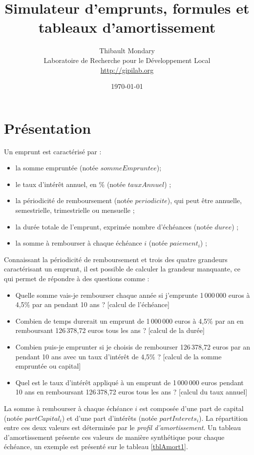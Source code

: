 \documentclass[11pt,a4paper]{scrartcl}
\title{Simulateur d'emprunts, formules et tableaux d'amortissement}
\date{\today}
\author{Thibault Mondary\\Laboratoire de Recherche pour le Développement Local\\\small\url{http://gipilab.org}}
\begin{document}
\maketitle

\section{Présentation}

Un emprunt est caractérisé par :

\begin{itemize}
	\item la somme empruntée (notée $sommeEmpruntee$);
	\item le taux d'intérêt annuel, en \% (notée $tauxAnnuel$) ;
	\item la périodicité de remboursement (notée $periodicite$), qui peut être annuelle, semestrielle, trimestrielle ou mensuelle ;
	\item la durée totale de l'emprunt, exprimée nombre d'échéances (notée $duree$) ;
	\item la somme à rembourser à chaque échéance $i$ (notée $paiement_{i}$) ;
\end{itemize}

Connaissant la périodicité de remboursement et trois des quatre grandeurs caractérisant un emprunt, il est possible de calculer la grandeur manquante, ce qui permet de répondre à des questions comme :

\begin{itemize}
	\item Quelle somme vais-je rembourser chaque année si j'emprunte 1\,000\,000 euros à 4,5\% par an pendant 10 ans ? [calcul de l'échéance]
	\item Combien de temps durerait un emprunt de 1\,000\,000 euros à 4,5\% par an en remboursant 126\,378,72 euros tous les ans ? [calcul de la durée]
	\item Combien puis-je emprunter si je choisis de rembourser 126\,378,72 euros par an pendant 10 ans avec un taux d'intérêt de 4,5\% ? [calcul de la somme empruntée ou capital]
	\item Quel est le taux d'intérêt appliqué à un emprunt de 1\,000\,000 euros pendant 10 ans en remboursant 126\,378,72 euros tous les ans ? [calcul du taux annuel]
\end{itemize}



La somme à rembourser à chaque échéance $i$ est composée d'une part de capital (notée $partCapital_{i}$) et d'une part d'intérêts (notée $partInterets_{i}$). La répartition entre ces deux valeurs est déterminée par le \emph{profil d'amortissement}. Un tableau d'amortissement présente ces valeurs de manière synthétique pour chaque échéance, un exemple est présenté sur le tableau \ref{tblAmort1}.
\end{document}
